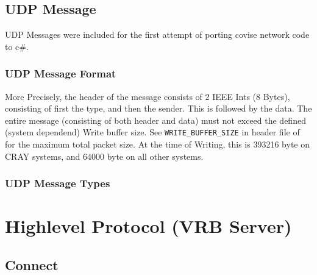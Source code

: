 \subsection{UDP Message}

UDP Messages were included for the first attempt of porting covise network code to c\#.

\subsubsection{UDP Message Format}

\begin{messagedesc}
\end{messagedesc}

More Precisely, the header of the message consists of 2 IEEE Ints (8 Bytes), consisting of first the type, and then the sender. This is followed by the data. The entire message (consisting of both header and data) must not exceed the defined (system dependend) Write buffer size. See \lstinline|WRITE_BUFFER_SIZE| in header file of  for the maximum total packet size. At the time of Writing, this is 393216 byte on CRAY systems, and 64000 byte on all other systems.

\subsubsection{UDP Message Types}

\begin{messagetypes}
\end{messagetypes}

\section{Highlevel Protocol (VRB Server)}

\subsection{Connect}

